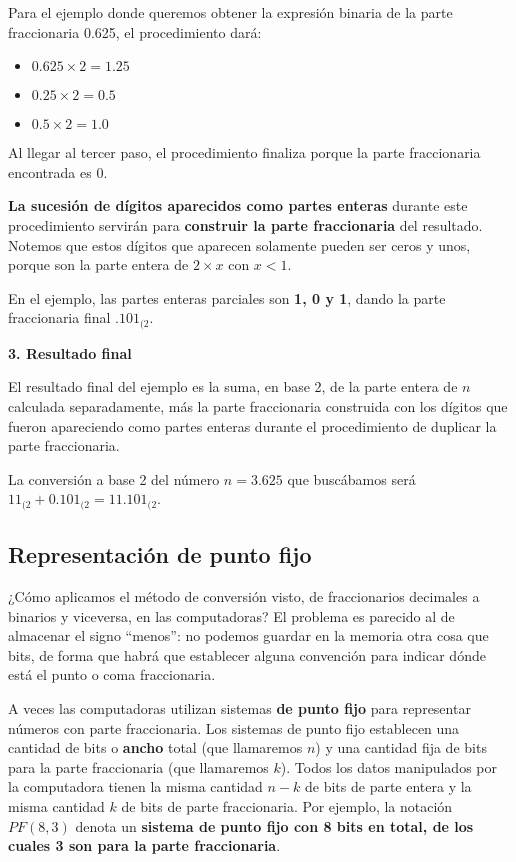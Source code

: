 \documentclass[spanish,a4paper,]{article}
\providecommand{\tightlist}{%
  \setlength{\itemsep}{0pt}\setlength{\parskip}{0pt}}
\begin{document}
Para el ejemplo donde queremos obtener la expresión binaria de la parte
fraccionaria 0.625, el procedimiento dará:

\begin{itemize}
\tightlist
\item
  \(0.625 \times 2 = 1.25\)
\item
  \(0.25 \times 2 = 0.5\)
\item
  \(0.5 \times 2 = 1.0\)
\end{itemize}

Al llegar al tercer paso, el procedimiento finaliza porque la parte
fraccionaria encontrada es 0.

\textbf{La sucesión de dígitos aparecidos como partes enteras} durante
este procedimiento servirán para \textbf{construir la parte
fraccionaria} del resultado. Notemos que estos dígitos que aparecen
solamente pueden ser ceros y unos, porque son la parte entera de
\(2\times x\) con \(x < 1\).

En el ejemplo, las partes enteras parciales son \textbf{1, 0 y 1}, dando
la parte fraccionaria final \(.101_{(2}\).

\textbf{3. Resultado final}

El resultado final del ejemplo es la suma, en base 2, de la parte entera
de \(n\) calculada separadamente, más la parte fraccionaria construida
con los dígitos que fueron apareciendo como partes enteras durante el
procedimiento de duplicar la parte fraccionaria.

La conversión a base 2 del número \(n = 3.625\) que buscábamos será
\(11_{(2} + 0.101_{(2} = 11.101_{(2}\).

\hypertarget{representaciuxf3n-de-punto-fijo}{%
\subsection{Representación de punto
fijo}\label{representaciuxf3n-de-punto-fijo}}

¿Cómo aplicamos el método de conversión visto, de fraccionarios
decimales a binarios y viceversa, en las computadoras? El problema es
parecido al de almacenar el signo ``menos'': no podemos guardar en la
memoria otra cosa que bits, de forma que habrá que establecer alguna
convención para indicar dónde está el punto o coma fraccionaria.

A veces las computadoras utilizan sistemas \textbf{de punto fijo} para
representar números con parte fraccionaria. Los sistemas de punto fijo
establecen una cantidad de bits o \textbf{ancho} total (que llamaremos
\(n\)) y una cantidad fija de bits para la parte fraccionaria (que
llamaremos \(k\)). Todos los datos manipulados por la computadora tienen
la misma cantidad \(n-k\) de bits de parte entera y la misma cantidad
\(k\) de bits de parte fraccionaria. Por ejemplo, la notación
\(PF(8,3)\) denota un \textbf{sistema de punto fijo con 8 bits en total,
de los cuales 3 son para la parte fraccionaria}.
\end{document}
